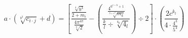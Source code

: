 \documentclass[12pt,a4paper]{article}
\author{Kaszmán Dániel}
\begin{document}
$$ a\cdot\left(\sqrt[b^3]{c_{i\cdot j}}+d \right)= \left[ \frac{\frac{\sqrt[4]{b^3}}{2+m_i}}{\frac{4\pi^{4\pi}}{\sqrt[\pi]{2}}} - \left( \frac{\frac{4^{6^{c \div b}+1}}{\sqrt[3+c^4]{m_k}}}{\frac{k}{l} \div \sqrt[4_k]{4_l}} \right) \div 2 \right] \cdot \left( \frac{2c^{k_l}}{4 \cdot \frac{4^3}{5^4}} \right) $$
\end{document}
